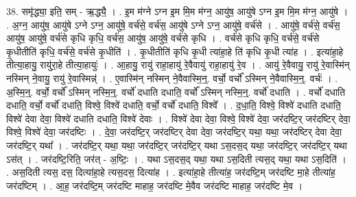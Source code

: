 \documentclass[17pt]{extarticle}
\begin{document}
38. समृ॑द्ध्या॒ इति॒ सम् - ऋ॒द्ध्यै॒ । . इ॒म म॑ग्ने ऽग्न इ॒म मि॒म म॑ग्न॒ आयु॑ष॒ आयु॑षे ऽग्न इ॒म मि॒म म॑ग्न॒ आयु॑षे । . अ॒ग्न॒ आयु॑ष॒ आयु॑षे ऽग्ने ऽग्न॒ आयु॑षे॒ वर्च॑से॒ वर्च॑स॒ आयु॑षे ऽग्ने ऽग्न॒ आयु॑षे॒ वर्च॑से । . आयु॑षे॒ वर्च॑से॒ वर्च॑स॒ आयु॑ष॒ आयु॑षे॒ वर्च॑से कृधि कृधि॒ वर्च॑स॒ आयु॑ष॒ आयु॑षे॒ वर्च॑से कृधि । . वर्च॑से कृधि कृधि॒ वर्च॑से॒ वर्च॑से कृ॒धीतीति॑ कृधि॒ वर्च॑से॒ वर्च॑से कृ॒धीति॑ । . कृ॒धीतीति॑ कृधि कृ॒धी त्या॑हा॒हे ति॑ कृधि कृ॒धी त्या॑ह । . इत्या॑हा॒हे तीत्या॒हायु॒ रायु॑रा॒हे तीत्या॒हायुः॑ । . आ॒हायु॒ रायु॑ राहा॒हायु॑ रे॒वैवायु॑ राहा॒हायु॑ रे॒व । . आयु॑ रे॒वैवायु॒ रायु॑ रे॒वास्मि॑न् नस्मिन् ने॒वायु॒ रायु॑ रे॒वास्मिन्न्॑ । . ए॒वास्मि॑न् नस्मिन् ने॒वैवास्मि॒न्॒. वर्चो॒ वर्चो᳚ ऽस्मिन् ने॒वैवास्मि॒न्॒. वर्चः॑ । . अ॒स्मि॒न्॒. वर्चो॒ वर्चो᳚ ऽस्मिन् नस्मि॒न्॒. वर्चो॑ दधाति दधाति॒ वर्चो᳚ ऽस्मिन् नस्मि॒न्॒. वर्चो॑ दधाति । . वर्चो॑ दधाति दधाति॒ वर्चो॒ वर्चो॑ दधाति॒ विश्वे॒ विश्वे॑ दधाति॒ वर्चो॒ वर्चो॑ दधाति॒ विश्वे᳚ । . द॒धा॒ति॒ विश्वे॒ विश्वे॑ दधाति दधाति॒ विश्वे॑ देवा देवा॒ विश्वे॑ दधाति दधाति॒ विश्वे॑ देवाः । . विश्वे॑ देवा देवा॒ विश्वे॒ विश्वे॑ देवा॒ जर॑दष्टि॒र् जर॑दष्टिर् देवा॒ विश्वे॒ विश्वे॑ देवा॒ जर॑दष्टिः । . दे॒वा॒ जर॑दष्टि॒र् जर॑दष्टिर् देवा देवा॒ जर॑दष्टि॒र् यथा॒ यथा॒ जर॑दष्टिर् देवा देवा॒ जर॑दष्टि॒र् यथा᳚ । . जर॑दष्टि॒र् यथा॒ यथा॒ जर॑दष्टि॒र् जर॑दष्टि॒र् यथा ऽस॒दस॒द् यथा॒ जर॑दष्टि॒र् जर॑दष्टि॒र् यथा ऽस॑त् । . जर॑दष्टि॒रिति॒ जर॑त् - अ॒ष्टिः॒ । . यथा ऽस॒दस॒द् यथा॒ यथा ऽस॒दिती त्यस॒द् यथा॒ यथा ऽस॒दिति॑ । . अस॒दिती त्यस॒ दस॒ दित्या॑हा॒हे त्यस॒दस॒ दित्या॑ह । . इत्या॑हा॒हे तीत्या॑ह॒ जर॑दष्टि॒म् जर॑दष्टि मा॒हे तीत्या॑ह॒ जर॑दष्टिम् । . आ॒ह॒ जर॑दष्टि॒म् जर॑दष्टि माहाह॒ जर॑दष्टि मे॒वैव जर॑दष्टि माहाह॒ जर॑दष्टि मे॒व । \newline
\end{document}
